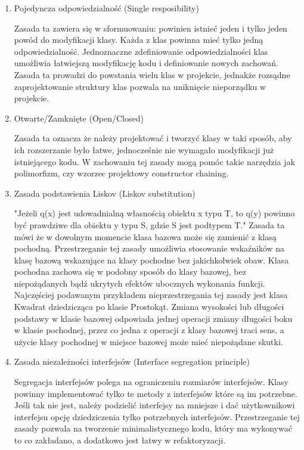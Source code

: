 \documentclass[oneside, eng]{mgr}
\begin{document}
\begin{enumerate}
\item Pojedyncza odpowiedzialność (Single resposibility)

Zasada ta zawiera się w sformuowaniu: powinien istnieć jeden i tylko jeden powód do modyfikacji klasy. Każda z klas powinna mieć tylko jedną odpowiedzialność. Jednoznaczne zdefiniowanie odpowiedzialności klas umożliwia łatwiejszą modyfikację kodu i definiowanie nowych zachowań. Zasada ta prowadzi do powstania wielu klas w projekcie, jednakże rozsądne zaprojektowanie struktury klas pozwala na uniknięcie nieporządku w projekcie.

\item Otwarte/Zamknięte (Open/Closed)

Zasada ta oznacza że należy projektować i tworzyć klasy w taki sposób, aby ich rozszerzanie było łatwe, jednocześnie nie wymagało modyfikacji już istniejącego kodu. W zachowaniu tej zasady mogą pomóc takie narzędzia jak polimorfizm, czy wzorzec projektowy constructor chaining.

\item Zasada podstawienia Liskov (Liskov substitution)

"Jeżeli q(x) jest udowadnialną własnością obiektu x typu T, to q(y) powinno być prawdziwe dla obiektu y typu S, gdzie S jest podtypem T." Zasada ta mówi że w dowolnym momencie klasa bazowa może się zamienić z klasą pochodną. Przestrzeganie tej zasady umożliwia stosowanie wskaźników na klasę bazową wskazujące na klasy pochodne bez jakichkolwiek obaw. Klasa pochodna zachowa się w podobny sposób do klasy bazowej, bez niepożądanych bądź ukrytych efektów ubocznych wykonania funkcji. Najczęściej podawanym przykładem nieprzestrzegania tej zasady jest klasa Kwadrat dziedzicząca po klasie Prostokąt. Zmiana wysokości lub długości podstawy w klasie bazowej odpowiada jednej operacji zmiany długości boku w klasie pochodnej, przez co jedna z operacji z klasy bazowej traci sens, a użycie klasy pochodnej w miejsce bazowej może mieć niepożądane skutki.

\item Zasada niezależności interfejsów (Interface segregation principle)

Segregacja interfejsów polega na ograniczeniu rozmiarów interfejsów. Klasy powinny implementować tylko te metody z interfejsów które są im potrzebne. Jeśli tak nie jest, należy podzielić interfejsy na mniejsze i dać użytkownikowi interfejsu opcję dziedziczenia tylko potrzebnych interfejsów. Przestrzeganie tej zasady pozwala na tworzenie minimalistycznego kodu, który ma wykonywać to co zakładano, a dodatkowo jest łatwy w refaktoryzacji.


\end{enumerate}
\end{document}

